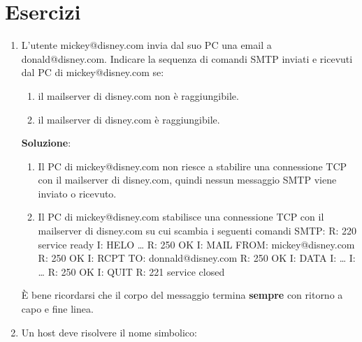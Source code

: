 \documentclass[11pt,a4paper]{article}
\theoremstyle{definition}
\begin{document}
\section{Esercizi}
\begin{enumerate}
	\item L’utente mickey@disney.com invia dal suo PC una email a donald@disney.com. Indicare la sequenza di comandi SMTP inviati e ricevuti dal PC di mickey@disney.com se:
	      \begin{enumerate}
		      \item il mailserver di disney.com non è raggiungibile.
		      \item il mailserver di disney.com è raggiungibile.
	      \end{enumerate}
	      \textbf{Soluzione}:
	      \begin{enumerate}
		      \item Il PC di mickey@disney.com non riesce a stabilire una connessione TCP con il mailserver di disney.com, quindi nessun messaggio SMTP viene inviato o ricevuto.
		      \item  Il PC di mickey@disney.com stabilisce una connessione TCP con il mailserver di
		            disney.com su cui scambia i seguenti comandi SMTP:\newline
		            R: 220 service ready \newline
		            I: HELO …\newline
		            R: 250 OK\newline
		            I: MAIL FROM: mickey@disney.com\newline
		            R: 250 OK \newline
		            I: RCPT TO: donnald@disney.com\newline
		            R: 250 OK \newline
		            I: DATA\newline
		            I: …\newline
		            I: …\newline
		            R: 250 OK\newline
		            I: QUIT\newline
		            R: 221 service closed\newline
	      \end{enumerate}
	      È bene ricordarsi che il corpo del messaggio termina \textbf{sempre} con ritorno a capo e fine linea.
	      \newpage
	\item Un host deve risolvere il nome simbolico:
	      \begin{center}

\end{center}
\end{enumerate}
\end{document}
